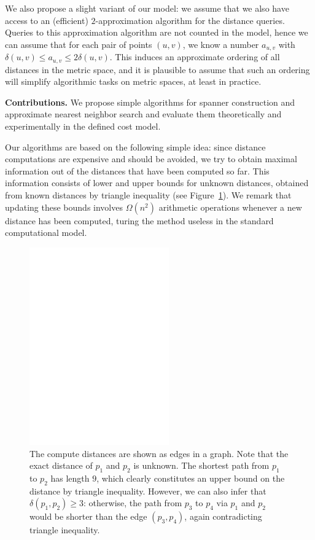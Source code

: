 \documentclass[a4paper,USenglish]{socg-lipics-v2018}
\newcommand{\dist}{\delta}
\newcommand{\myparagraph}[1]{\textbf{#1.}}
\begin{document}
We also propose a slight variant of our model: we assume that we also have access to an (efficient)
$2$-approximation algorithm for the distance queries. Queries to this approximation algorithm
are not counted in the model, hence we can assume that for each pair of points $(u,v)$, we
know a number $a_{u,v}$ with $\dist(u,v)\leq a_{u,v}\leq 2\dist(u,v)$. This induces an approximate ordering
of all distances in the metric space, and it is plausible to assume that such an ordering will simplify
algorithmic tasks on metric spaces, at least in practice.

\myparagraph{Contributions}
%
We propose simple algorithms for spanner construction and approximate nearest neighbor search
and evaluate them theoretically and experimentally in the defined cost model.

Our algorithms are based on the following simple idea: since distance computations are expensive
and should be avoided, we try to obtain maximal information out of the distances that have been computed
so far. 
This information consists of lower and upper bounds for unknown distances, obtained from known distances
by triangle inequality (see Figure~\ref{fig:1st_example}). We remark that updating these bounds involves $\Omega(n^2)$ arithmetic
operations whenever a new distance has been computed, turing the method useless in the standard computational model.

\begin{figure}[h]
\centering
\includegraphics[width=6cm]{intro_example.eps}
\caption{The compute distances are shown as edges in a graph. Note that the exact distance
of $p_1$ and $p_2$ is unknown. The shortest path from $p_1$ to $p_2$ has length $9$, which clearly
constitutes an upper bound on the distance by triangle inequality.
However, we can also infer that $\dist(p_1,p_2)\geq 3$:
otherwise, the path from $p_3$ to $p_4$ via $p_1$ and $p_2$
would be shorter than the edge $(p_3,p_4)$, again contradicting
triangle inequality.}
\label{fig:1st_example}
\end{figure}
\end{document}
